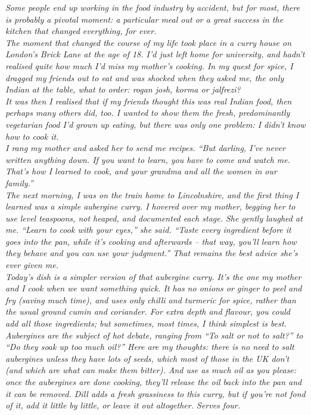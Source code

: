\documentclass{book}
\begin{document}
\emph{Some people end up working in the food industry by accident, but for most, there is probably a pivotal moment: a particular meal out or a great success in the kitchen that changed everything, for ever.\\ 
The moment that changed the course of my life took place in a curry house on London’s Brick Lane at the age of 18. I’d just left home for university, and hadn’t realised quite how much I’d miss my mother’s cooking. In my quest for spice, I dragged my friends out to eat and was shocked when they asked me, the only Indian at the table, what to order: rogan josh, korma or jalfrezi?\\ 
It was then I realised that if my friends thought this was real Indian food, then perhaps many others did, too. I wanted to show them the fresh, predominantly vegetarian food I’d grown up eating, but there was only one problem: I didn’t know how to cook it.\\ 
I rang my mother and asked her to send me recipes. “But darling, I’ve never written anything down. If you want to learn, you have to come and watch me. That’s how I learned to cook, and your grandma and all the women in our family.”\\ 
The next morning, I was on the train home to Lincolnshire, and the first thing I learned was a simple aubergine curry. I hovered over my mother, begging her to use level teaspoons, not heaped, and documented each stage. She gently laughed at me. “Learn to cook with your eyes,” she said. “Taste every ingredient before it goes into the pan, while it’s cooking and afterwards – that way, you’ll learn how they behave and you can use your judgment.” That remains the best advice she’s ever given me.\\ 
Today’s dish is a simpler version of that aubergine curry. It’s the one my mother and I cook when we want something quick. It has no onions or ginger to peel and fry (saving much time), and uses only chilli and turmeric for spice, rather than the usual ground cumin and coriander. For extra depth and flavour, you could add all those ingredients; but sometimes, most times, I think simplest is best.\\ 
Aubergines are the subject of hot debate, ranging from “To salt or not to salt?” to “Do they soak up too much oil?” Here are my thoughts: there is no need to salt aubergines unless they have lots of seeds, which most of those in the UK don’t (and which are what can make them bitter). And use as much oil as you please: once the aubergines are done cooking, they’ll release the oil back into the pan and it can be removed. Dill adds a fresh grassiness to this curry, but if you’re not fond of it, add it little by little, or leave it out altogether. Serves four.}\\\\ 
\end{document}

